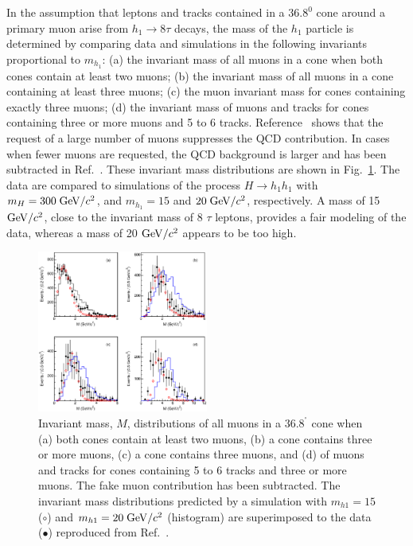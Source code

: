 \documentclass[twocolumn,10pt,prl,preprint,floatfix,nofootinbib,superscriptaddress,showpacs,amssymb]{revtex4}
\def\deg{^\circ}
\begin{document}

 In the assumption that leptons and tracks contained in a $36.8^0$ cone
 around a primary muon arise from $h_1 \rightarrow 8 \tau$ decays, the
 mass of the $h_1$ particle is determined by comparing data and simulations
 in the following invariants proportional to $m_{h_1}$: (a) the invariant
 mass of all muons in a cone when both cones contain at least two muons;
 (b) the invariant mass of all muons in a cone containing at least three  
 muons; (c) the muon invariant mass for cones containing exactly three muons;
 (d) the invariant mass of muons and tracks for cones containing three or
 more muons and 5 to 6 tracks. Reference~\cite{a0disc} shows that the request
 of a large number of muons suppresses the QCD contribution. In cases when
 fewer muons are requested, the QCD background is larger and has been 
 subtracted in Ref.~\cite{a0disc}. These invariant mass distributions are
 shown in Fig.~\ref{fig:fig_18}. The data are compared to simulations of
 the process $H \rightarrow h_1 h_1$ with $m_H = 300 \; {\rm GeV/}c^2$, and
 $m_{h_1} =15$ and $20 \; {\rm GeV/}c^2$, respectively. A mass of 15 ${\rm GeV/}c^2$,
 close to the invariant mass of 8 $\tau$ leptons, provides a fair modeling
 of the data, whereas a mass of 20 ${\rm GeV/}c^2$ appears to be too high. 
 \begin{figure}
 \begin{center}
 \vspace{-0.3in}
 \leavevmode
 \includegraphics*[width=0.5\textwidth]{fa0_18.eps}
 \caption[]{Invariant mass, $M$, distributions of all muons in a $36.8^{\deg}$
            cone when (a) both cones contain at least two muons, (b) a cone
            contains three or more muons, (c) a cone contains three muons,
            and (d) of muons and tracks for cones containing 5 to 6 tracks
            and three or more muons. The fake muon contribution has been
            subtracted. The invariant mass distributions predicted by
            a simulation with $m_{h1}=15$ ($\circ$) and $m_{h1}=20 \; {\rm GeV/}c^2$
            (histogram) are superimposed to the data ($\bullet$) reproduced
            from Ref.~\cite{a0disc}.  } 
 \label{fig:fig_18}
 \end{center}
 \end{figure}
\end{document}
